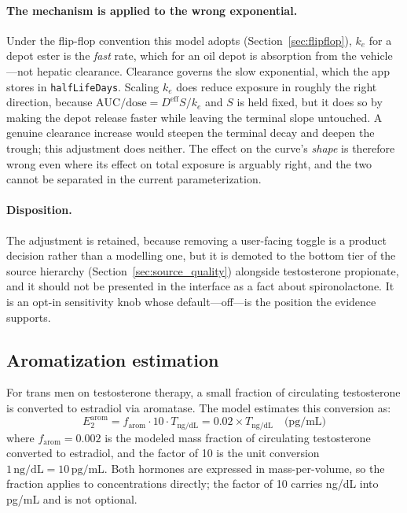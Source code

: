 \documentclass[11pt,a4paper]{article}
\newcommand{\code}[1]{\texttt{\small #1}}
\begin{document}
\paragraph{The mechanism is applied to the wrong exponential.} Under the
flip-flop convention this model adopts (Section~\ref{sec:flipflop}), $k_e$
for a depot ester is the \emph{fast} rate, which for an oil depot is
absorption from the vehicle---not hepatic clearance. Clearance governs the
slow exponential, which the app stores in \code{halfLifeDays}. Scaling
$k_e$ does reduce exposure in roughly the right direction, because
$\mathrm{AUC}/\text{dose} = D^{\text{eff}} S / k_e$ and $S$ is held fixed,
but it does so by making the depot release faster while leaving the terminal
slope untouched. A genuine clearance increase would steepen the terminal
decay and deepen the trough; this adjustment does neither. The effect on the
curve's \emph{shape} is therefore wrong even where its effect on total
exposure is arguably right, and the two cannot be separated in the current
parameterization.

\paragraph{Disposition.} The adjustment is retained, because removing a
user-facing toggle is a product decision rather than a modelling one, but it
is demoted to the bottom tier of the source hierarchy
(Section~\ref{sec:source_quality}) alongside testosterone propionate, and it
should not be presented in the interface as a fact about spironolactone. It
is an opt-in sensitivity knob whose default---off---is the position the
evidence supports.

\subsection{Aromatization estimation}
\label{sec:aromatization}

For trans men on testosterone therapy, a small fraction of circulating
testosterone is converted to estradiol via aromatase. The model
estimates this conversion as:
\begin{equation}
E_2^{\text{arom}} = f_{\text{arom}} \cdot 10 \cdot T_{\text{ng/dL}}
                  = 0.02 \times T_{\text{ng/dL}} \quad \text{(pg/mL)}
\label{eq:aromatization}
\end{equation}
where $f_{\text{arom}} = 0.002$ is the modeled mass fraction of circulating
testosterone converted to estradiol, and the factor of 10 is the unit
conversion $1\,\text{ng/dL} = 10\,\text{pg/mL}$. Both hormones are expressed
in mass-per-volume, so the fraction applies to concentrations directly; the
factor of 10 carries ng/dL into pg/mL and is not optional.
\end{document}
